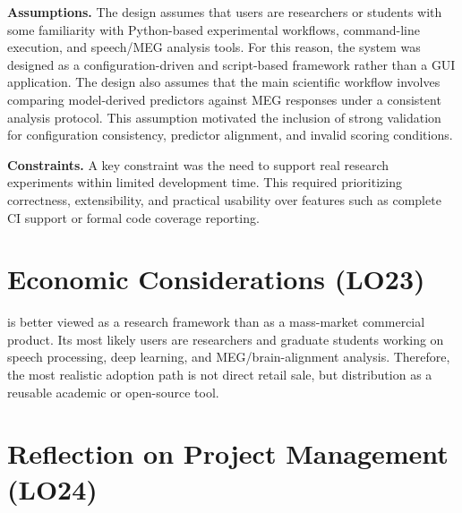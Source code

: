 \documentclass{article}
\begin{document}
\textbf{Assumptions.}
The design assumes that users are researchers or students with some familiarity with Python-based experimental workflows, command-line execution, and speech/MEG analysis tools.
For this reason, the system was designed as a configuration-driven and script-based framework rather than a GUI application.
The design also assumes that the main scientific workflow involves comparing model-derived predictors against MEG responses under a consistent analysis protocol.
This assumption motivated the inclusion of strong validation for configuration consistency, predictor alignment, and invalid scoring conditions.

\textbf{Constraints.}
A key constraint was the need to support real research experiments within limited development time.
This required prioritizing correctness, extensibility, and practical usability over features such as complete CI support or formal code coverage reporting.












\section{Economic Considerations (LO23)}

\progname{} is better viewed as a research framework than as a mass-market commercial product.
Its most likely users are researchers and graduate students working on speech processing, deep learning, and MEG/brain-alignment analysis.
Therefore, the most realistic adoption path is not direct retail sale, but distribution as a reusable academic or open-source tool.





\section{Reflection on Project Management (LO24)}
\end{document}
